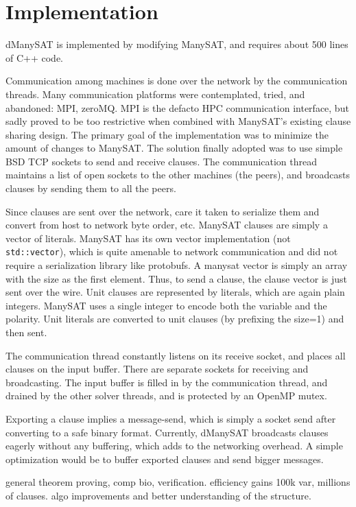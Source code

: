 \documentclass{article}
\begin{document}
\section{Implementation}

dManySAT is implemented by modifying ManySAT, and requires about 500
lines of C++ code. 

Communication among machines is done over the network by the
communication threads. Many communication platforms were contemplated,
tried, and abandoned: MPI, zeroMQ. MPI is the defacto HPC
communication interface, but sadly proved to be too restrictive when
combined with ManySAT's existing clause sharing design. The primary
goal of the implementation was to minimize the amount of changes to
ManySAT. The solution finally adopted was to use simple BSD TCP
sockets to send and receive clauses. The communication thread
maintains a list of open sockets to the other machines (the peers),
and broadcasts clauses by sending them to all the peers.


Since clauses are sent over the network, care it taken to serialize
them and convert from host to network byte order, etc. ManySAT clauses
are simply a vector of literals. ManySAT has its own vector
implementation (not \texttt{std::vector}), which is quite amenable to
network communication and did not require a serialization library like
protobufs. A manysat vector is simply an array with the size as the
first element. Thus, to send a clause, the clause vector is just sent
over the wire. Unit clauses are represented by literals, which are
again plain integers. ManySAT uses a single integer to encode both the
variable and the polarity. Unit literals are converted to unit clauses
(by prefixing the size=1) and then sent.


The communication thread constantly listens on its receive socket, and
places all clauses on the input buffer. There are separate sockets for
receiving and broadcasting. The input buffer is filled in by the
communication thread, and drained by the other solver threads, and is
protected by an OpenMP mutex. 


Exporting a clause implies a message-send, which is simply a socket
send after converting to a safe binary format. Currently, dManySAT
broadcasts clauses eagerly without any buffering, which adds to the
networking overhead. A simple optimization would be to buffer exported
clauses and send bigger messages.



general theorem proving, comp bio, verification. efficiency gains 100k var, millions of clauses. algo improvements and better understanding of the structure. 
\end{document}
